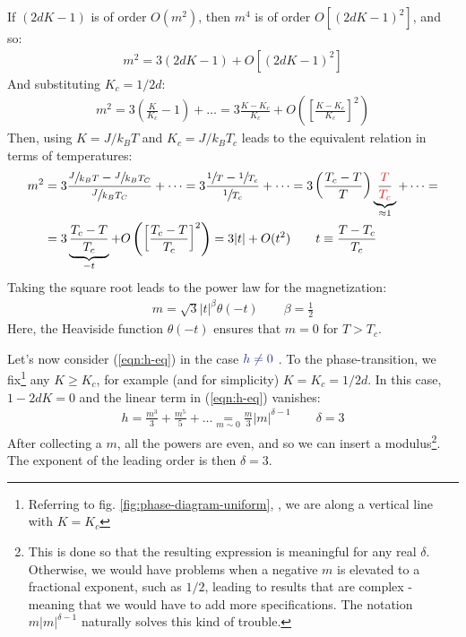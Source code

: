 \documentclass[../../main.tex]{subfiles}
\begin{document}
If $(2dK - 1)$ is of order $O(m^2)$, then $m^4$ is of order $O[(2dK-1)^2]$, and so:
\begin{align*}
    m^2 = 3(2dK-1) + O[(2dK-1)^2]
\end{align*}
And substituting $K_c = 1/2d$:
\begin{align}\label{eqn:msquareK}
    m^2 = 3\left(\frac{K}{K_c}-1 \right) + \dots = 3 \frac{K-K_c}{K_c} + O\left(\left[\frac{K-K_c}{K_c} \right]^2\right) 
\end{align}
Then, using $K=J/k_B T$ and $K_c = J/k_B T_c$ leads to the equivalent relation in terms of temperatures:
\begin{align*}
    m^2 &= 3 \frac{\sfrac{J}{k_BT} - \sfrac{J}{k_B T_C}}{\sfrac{J}{k_B T_C}} +\dots = 3 \frac{\sfrac{1}{T} - \sfrac{1}{T_c}}{\sfrac{1}{T_c}} +\dots = 3\left(\frac{T_c - T}{T} \right) \underbrace{\frac{\textcolor{Red}{T}}{\textcolor{Red}{T_c}}}_{\approx 1}  + \dots =\\ 
    &= 3 \underbrace{\frac{T_c - T}{T_c}}_{-t} + O\left(\left[\frac{T_c - T}{T_c} \right]^2\right)  = 3 |t| + O(t^2) \qquad t \equiv \frac{T-T_c}{T_c} 
\end{align*} 
Taking the square root leads to the power law for the magnetization:
\begin{align}\label{eqn:m-power-law-h0}
    m = \sqrt{3} |t|^\beta \theta(-t) \qquad \beta = \frac{1}{2} 
\end{align}
Here, the Heaviside function $\theta(-t)$ ensures that $m=0$ for $T > T_c$.

\medskip

Let's now consider (\ref{eqn:h-eq}) in the case $\textcolor{Blue}{h \neq 0}$ . To  the phase-transition, we fix\footnote{Referring to fig. \ref{fig:phase-diagram-uniform}, \pageref{fig:phase-diagram-uniform}, we are  along a vertical line with $K = K_c$} any $K \geq K_c$, for example (and for simplicity) $K=K_c = 1/2d$. In this case, $1-2dK = 0$ and the linear term in (\ref{eqn:h-eq}) vanishes:
\begin{align}\label{eqn:m-power-law-h}
    h = \frac{m^3}{3} + \frac{m^5}{5} + \dots \underset{m\sim 0}{=} \frac{m}{3} |m|^{\delta - 1} \qquad \delta=3
\end{align}
After collecting a $m$, all the powers are even, and so we can insert a modulus\footnote{This is done so that the resulting expression is meaningful for any real $\delta$. Otherwise, we would have problems when a negative $m$ is elevated to a fractional exponent, such as $1/2$, leading to results that are complex - meaning that we would have to add more specifications. The notation $m|m|^{\delta-1}$ naturally solves this kind of trouble.}. The exponent of the leading order is then $\delta=3$.
\end{document}
